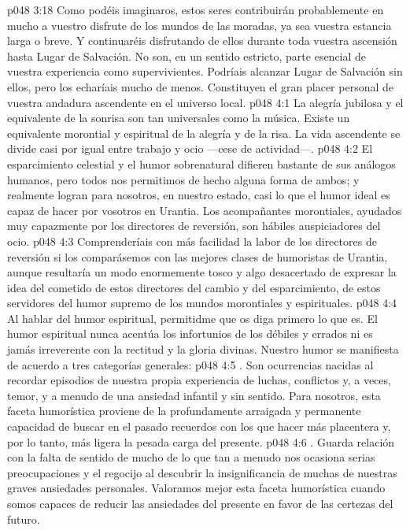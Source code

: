 \vs p048 3:18 Como podéis imaginaros, estos seres contribuirán probablemente en mucho a vuestro disfrute de los mundos de las moradas, ya sea vuestra estancia larga o breve. Y continuaréis disfrutando de ellos durante toda vuestra ascensión hasta Lugar de Salvación. No son, en un sentido estricto, parte esencial de vuestra experiencia como supervivientes. Podríais alcanzar Lugar de Salvación sin ellos, pero los echaríais mucho de menos. Constituyen el gran placer personal de vuestra andadura ascendente en el universo local.
\vs p048 4:1 La alegría jubilosa y el equivalente de la sonrisa son tan universales como la música. Existe un equivalente morontial y espiritual de la alegría y de la risa. La vida ascendente se divide casi por igual entre trabajo y ocio ---cese de actividad---.
\vs p048 4:2 El esparcimiento celestial y el humor sobrenatural difieren bastante de sus análogos humanos, pero todos nos permitimos de hecho alguna forma de ambos; y realmente logran para nosotros, en nuestro estado, casi lo que el humor ideal es capaz de hacer por vosotros en Urantia. Los acompañantes morontiales, ayudados muy capazmente por los directores de reversión, son hábiles auspiciadores del ocio.
\vs p048 4:3 Comprenderíais con más facilidad la labor de los directores de reversión si los comparásemos con las mejores clases de humoristas de Urantia, aunque resultaría un modo enormemente tosco y algo desacertado de expresar la idea del cometido de estos directores del cambio y del esparcimiento, de estos servidores del humor supremo de los mundos morontiales y espirituales.
\vs p048 4:4 \pc Al hablar del humor espiritual, permitidme que os diga primero lo que  es. El humor espiritual nunca acentúa los infortunios de los débiles y errados ni es jamás irreverente con la rectitud y la gloria divinas. Nuestro humor se manifiesta de acuerdo a tres categorías generales:
\vs p048 4:5 . Son ocurrencias nacidas al recordar episodios de nuestra propia experiencia de luchas, conflictos y, a veces, temor, y a menudo de una ansiedad infantil y sin sentido. Para nosotros, esta faceta humorística proviene de la profundamente arraigada y permanente capacidad de buscar en el pasado recuerdos con los que hacer más placentera y, por lo tanto, más ligera la pesada carga del presente.
\vs p048 4:6 . Guarda relación con la falta de sentido de mucho de lo que tan a menudo nos ocasiona serias preocupaciones y el regocijo al descubrir la insignificancia de muchas de nuestras graves ansiedades personales. Valoramos mejor esta faceta humorística cuando somos capaces de reducir las ansiedades del presente en favor de las certezas del futuro.
